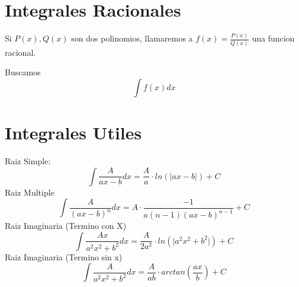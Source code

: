 \documentclass[11pt]{article}
\date{\today}
\title{}
\begin{document}
\section{Integrales Racionales}
\label{sec:org11ed78f}
Si \(P(x), Q(x)\) son dos polinomios, llamaremos a \(f(x) = \frac{P(x)}{Q(x)}\) una funcion racional.

Buscamos 
\[ 
\int f(x) dx
\]

\section{Integrales Utiles}
\label{sec:org16b4fb7}
Raiz Simple:
\[ 
\int \frac{A}{ax-b} dx = \frac{A}{a} \cdot ln(\lvert ax-b \rvert) + C 
\]
Raiz Multiple
\[ 
\int \frac{A}{(ax-b)^{n}} dx = A \cdot \frac{-1}{a(n-1)(ax-b)^{n-1}} + C
\]
Raiz Imaginaria (Termino con X) 
\[ 
\int \frac{Ax}{a^{2}x^{2} + b^{2}} dx = \frac{A}{2a^{2}} \cdot ln(\lvert a^{2}x^{2} + b^{2} \rvert)  + C 
\]
Raiz Imaginaria (Termino sin x)
\[ 
\int \frac{A}{a^{2}x^{2} + b^{2}} dx = \frac{A}{ab} \cdot arctan(\frac{ax}{b}) + C 
\]
\end{document}
